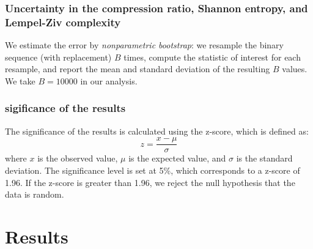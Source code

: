 \subsubsection{Uncertainty in the compression ratio, Shannon entropy, and Lempel-Ziv complexity}
We estimate the error by \textit{nonparametric bootstrap}: we resample the binary sequence (with replacement) $B$ times, compute the statistic of interest for each resample, and report the mean and standard deviation of the resulting $B$ values. We take $B=10000$ in our analysis.

\subsubsection{sigificance of the results}
The significance of the results is calculated using the z-score, which is defined as:
\begin{equation}
z = \frac{x - \mu}{\sigma}
\end{equation}
where $x$ is the observed value, $\mu$ is the expected value, and $\sigma$ is the standard deviation. The significance level is set at 5\%, which corresponds to a z-score of 1.96. If the z-score is greater than 1.96, we reject the null hypothesis that the data is random. 

\section{Results}
